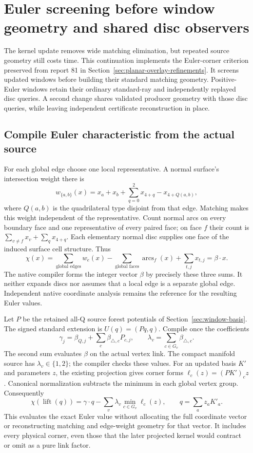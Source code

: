 \section{Euler screening before window geometry and shared disc observers}
\label{sec:window-euler}

The kernel update removes wide matching elimination, but repeated source
geometry still costs time. This continuation implements the Euler-corner
criterion preserved from report 81 in
Section~\ref{sec:planar-overlay-refinements}. It screens updated windows
before building their standard matching geometry. Positive-Euler windows
retain their ordinary standard-ray and independently replayed disc queries.
A second change shares validated producer geometry with those disc queries,
while leaving independent certificate reconstruction in place.

\subsection{Compile Euler characteristic from the actual source}

For each global edge choose one local representative. A normal surface's
intersection weight there is
\[
 w_{\{a,b\}}(x)=x_a+x_b+\sum_{q=0}^2x_{4+q}
                                  -x_{4+Q(a,b)},
\]
where $Q(a,b)$ is the quadrilateral type disjoint from that edge.
Matching makes this weight independent of the representative. Count normal
arcs on every boundary face and one representative of every paired face;
on face $f$ their count is $\sum_{v\ne f}x_v+\sum_qx_{4+q}$.
Each elementary normal disc supplies one face of the induced surface cell
structure. Thus
\[
 \chi(x)=\sum_{\text{global edges}}w_e(x)
       -\sum_{\text{global faces}}\operatorname{arcs}_f(x)
       +\sum_{t,j}x_{t,j}=\beta\cdot x.
\]
The native compiler forms the integer vector $\beta$ by precisely these
three sums. It neither expands discs nor assumes that a local edge is a
separate global edge. Independent native coordinate analysis remains the
reference for the resulting Euler values.

Let $P$ be the retained all-Q source forest potentials of
Section~\ref{sec:window-basis}. The signed standard extension is
$U(q)=(Pq,q)$. Compile once the coefficients
\[
 \gamma_j=\beta_{Q,j}+\sum_c\beta_{\triangle,c}P_{c,j},
 \qquad \lambda_v=\sum_{c\in G_v}\beta_{\triangle,c}.
\]
The second sum evaluates $\beta$ on the actual vertex link. The compact
manifold source has $\lambda_v\in\{1,2\}$; the compiler checks these values.
For an updated basis $K'$ and parameters $z$, the existing projection gives
corner forms $\ell_c(z)=(PK')_c z$. Canonical normalization subtracts the
minimum in each global vertex group. Consequently
\[
 \chi(\operatorname{lift}(q))=\gamma\cdot q
                   -\sum_v\lambda_v\min_{c\in G_v}\ell_c(z),
 \qquad q=\sum_a z_aK'_a.
\]
This evaluates the exact Euler value without allocating the full coordinate
vector or reconstructing matching and edge-weight geometry for that vector.
It includes every physical corner, even those that the later projected
kernel would contract or omit as a pure link factor.

